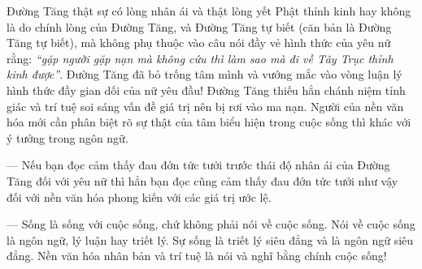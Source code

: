 Đường Tăng thật sự có lòng nhân ái và thật lòng yết Phật thỉnh kinh hay không là do chính lòng của Đường Tăng, và Đường Tăng tự biết (căn bản là Đường Tăng tự biết), mà không phụ thuộc vào câu nói đầy vẻ hình thức của yêu nữ rằng: \emph{``gặp người gặp nạn mà không cứu thì làm sao mà đi về Tây Trục thỉnh kinh được''}. Đường Tăng đã bỏ trống tâm mình và vướng mắc vào vòng luận lý hình thức đầy gian dối của nữ yêu đầu! Đường Tăng thiếu hẳn chánh niệm tỉnh giác và trí tuệ soi sáng vấn đề giá trị nên bị rơi vào ma nạn. Người của nền văn hóa mới cần phân biệt rõ sự thật của tâm biểu hiện trong cuộc sống thì khác với ý tưởng trong ngôn ngữ.

— Nếu bạn đọc cảm thấy đau đớn tức tưởi trước thái độ nhân ái của Đường Tăng đối với yêu nữ thì hẳn bạn đọc cũng cảm thấy đau đớn tức tưởi như vậy đối với nền văn hóa phong kiến với các giá trị ước lệ.

— Sống là sống với cuộc sống, chứ không phải nói về cuộc sống. Nói về cuộc sống là ngôn ngữ, lý luận hay triết lý. Sự sống là triết lý siêu đẳng và là ngôn ngữ siêu đẳng. Nền văn hóa nhân bản và trí tuệ là nói và nghĩ bằng chính cuộc sống!
